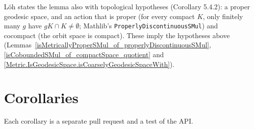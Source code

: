 L\"oh states the lemma also with topological hypotheses (Corollary 5.4.2): a proper geodesic
space, and an action that is proper (for every compact $K$, only finitely many $g$ have $g K \cap
K \ne \emptyset$; Mathlib's \texttt{ProperlyDiscontinuousSMul}) and cocompact (the orbit space is
compact). These imply the hypotheses above
(Lemmas~\ref{isMetricallyProperSMul_of_properlyDiscontinuousSMul},
\ref{isCoboundedSMul_of_compactSpace_quotient} and
\ref{Metric.IsGeodesicSpace.isCoarselyGeodesicSpaceWith}).



\section{Corollaries}

Each corollary is a separate pull request and a test of the API.





